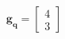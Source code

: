 \documentclass[preview]{standalone}
\begin{document}
\begin{align*}
\mathbf{g_q} = \begin{bmatrix} 4 \\ 3 \end{bmatrix}
\end{align*}
\end{document}
